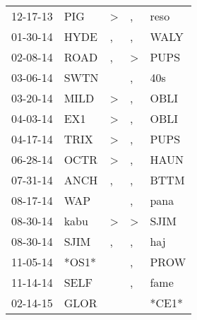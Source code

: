 \begin{supertabular}{p{0.07\textwidth}p{0.06\textwidth}p{0.02\textwidth}p{0.02\textwidth}p{0.06\textwidth}}
          12-17-13\textsuperscript{} &            PIG\textsuperscript{} &     \textgreater &             , &  reso\textsuperscript{} \\
          01-30-14\textsuperscript{} &           HYDE\textsuperscript{} &                , &             , &  WALY\textsuperscript{} \\
          02-08-14\textsuperscript{} &           ROAD\textsuperscript{} &                , &  \textgreater &  PUPS\textsuperscript{} \\
          03-06-14\textsuperscript{} &           SWTN\textsuperscript{} &                  &             , &   40s\textsuperscript{} \\
          03-20-14\textsuperscript{} &           MILD\textsuperscript{} &     \textgreater &             , &  OBLI\textsuperscript{} \\
          04-03-14\textsuperscript{} &            EX1\textsuperscript{} &     \textgreater &             , &  OBLI\textsuperscript{} \\
          04-17-14\textsuperscript{} &           TRIX\textsuperscript{} &     \textgreater &             , &  PUPS\textsuperscript{} \\
          06-28-14\textsuperscript{} &           OCTR\textsuperscript{} &     \textgreater &             , &  HAUN\textsuperscript{} \\
          07-31-14\textsuperscript{} &           ANCH\textsuperscript{} &                , &             , &  BTTM\textsuperscript{} \\
          08-17-14\textsuperscript{} &            WAP\textsuperscript{} &                  &             , &  pana\textsuperscript{} \\
          08-30-14\textsuperscript{} &           kabu\textsuperscript{} &     \textgreater &  \textgreater &  SJIM\textsuperscript{} \\
          08-30-14\textsuperscript{} &           SJIM\textsuperscript{} &                , &             , &   haj\textsuperscript{} \\
          11-05-14\textsuperscript{} &                            *OS1* &                  &             , &  PROW\textsuperscript{} \\
          11-14-14\textsuperscript{} &           SELF\textsuperscript{} &                  &             , &  fame\textsuperscript{} \\
          02-14-15\textsuperscript{} &           GLOR\textsuperscript{} &                  &               &                   *CE1* \\

\end{supertabular}
